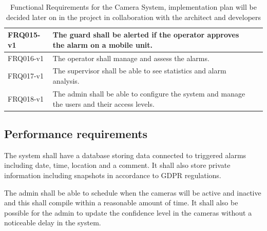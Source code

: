 \documentclass{article}
\begin{document}
\begin{table}[h]
\begin{tabular}{|l|p{8cm}|p{5cm}|}
\hline
FRQ015-v1 & The guard shall be alerted if the operator approves the alarm on a mobile unit. &  \\
\hline
FRQ016-v1 & The operator shall manage and assess the alarms. &  \\
\hline
FRQ017-v1 & The supervisor shall be able to see statistics and alarm analysis. &  \\
\hline
FRQ018-v1 & The admin shall be able to configure the system and manage the users and their access levels. &  \\
\hline
\end{tabular}
\captionsetup{justification=centering}
\caption{Functional Requirements for the Camera System, implementation plan will be decided later on in the project in collaboration with the architect and developers}
\label{table:functional_requirements}
\end{table}

 




\subsection{Performance requirements}
The system shall have a database storing data connected to triggered alarms including date, time, location and a comment. It shall also store private information including snapshots in accordance to GDPR regulations.

    The admin shall be able to schedule when the cameras will be active and inactive and this shall compile within a reasonable amount of time.  It shall also be possible for the admin to update the confidence level in the cameras without a noticeable delay in the system.   
\end{document}
